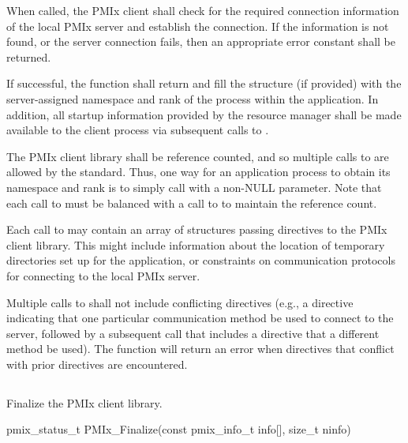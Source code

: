 When called, the \ac{PMIx} client shall check for the required connection information of the local \ac{PMIx} server and establish the connection.
If the information is not found, or the server connection fails, then an appropriate error constant shall be returned.

If successful, the function shall return  and fill the  structure (if provided) with the server-assigned namespace and rank of the process within the application.
In addition, all startup information provided by the resource manager shall be made available to the client process via subsequent calls to .

The \ac{PMIx} client library shall be reference counted, and so multiple calls to  are allowed by the standard.
Thus, one way for an application process to obtain its namespace and rank is to simply call  with a non-NULL  parameter.
Note that each call to  must be balanced with a call to  to maintain the reference count.

Each call to  may contain an array of  structures passing directives to the \ac{PMIx} client library.
This might include information about the location of temporary directories set up for the application, or constraints on communication protocols for connecting to the local \ac{PMIx} server.

Multiple calls to  shall not include conflicting directives (e.g., a directive indicating that one particular communication method be used to connect to the server, followed by a subsequent call that includes a directive that a different method be used).
The  function will return an error when directives that conflict with prior directives are encountered.


\subsection{}

\summary

Finalize the PMIx client library.

\format

\cspecificstart
\begin{codepar}
pmix_status_t
PMIx_Finalize(const pmix_info_t info[], size_t ninfo)
\end{codepar}
\cspecificend

